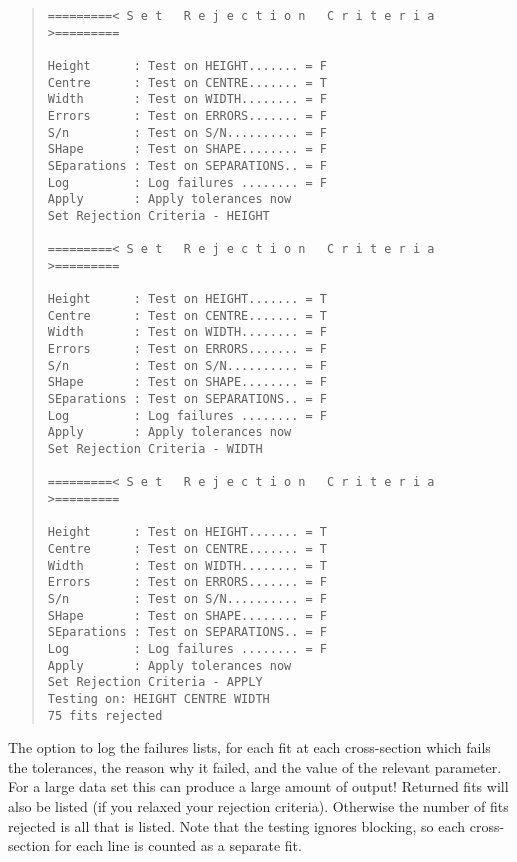 \begin{quote}
\begin{verbatim}
=========< S e t   R e j e c t i o n   C r i t e r i a >=========
 
Height      : Test on HEIGHT....... = F
Centre      : Test on CENTRE....... = T
Width       : Test on WIDTH........ = F
Errors      : Test on ERRORS....... = F
S/n         : Test on S/N.......... = F
SHape       : Test on SHAPE........ = F
SEparations : Test on SEPARATIONS.. = F
Log         : Log failures ........ = F
Apply       : Apply tolerances now
Set Rejection Criteria - HEIGHT
 
=========< S e t   R e j e c t i o n   C r i t e r i a >=========
 
Height      : Test on HEIGHT....... = T
Centre      : Test on CENTRE....... = T
Width       : Test on WIDTH........ = F
Errors      : Test on ERRORS....... = F
S/n         : Test on S/N.......... = F
SHape       : Test on SHAPE........ = F
SEparations : Test on SEPARATIONS.. = F
Log         : Log failures ........ = F
Apply       : Apply tolerances now
Set Rejection Criteria - WIDTH
 
=========< S e t   R e j e c t i o n   C r i t e r i a >=========
 
Height      : Test on HEIGHT....... = T
Centre      : Test on CENTRE....... = T
Width       : Test on WIDTH........ = T
Errors      : Test on ERRORS....... = F
S/n         : Test on S/N.......... = F
SHape       : Test on SHAPE........ = F
SEparations : Test on SEPARATIONS.. = F
Log         : Log failures ........ = F
Apply       : Apply tolerances now
Set Rejection Criteria - APPLY
Testing on: HEIGHT CENTRE WIDTH
75 fits rejected
\end{verbatim}\end{quote}
The option to log the failures lists, for each fit at each
cross-section which fails the tolerances, the reason why it failed, and
the value of the relevant parameter.
For a large data set this can produce a large amount of output!
Returned fits will also be listed (if you relaxed your rejection
criteria).
Otherwise the number of fits rejected is all that is listed.
Note that the testing ignores blocking, so each cross-section for each
line is counted as a separate fit.

